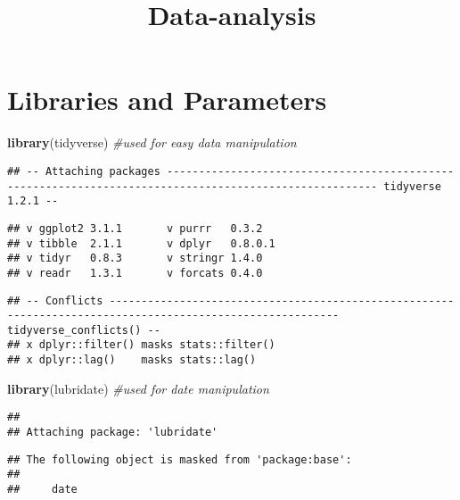 \documentclass[]{article}
\title{Data-analysis}
\author{}
\date{}
\newenvironment{Shaded}{\begin{snugshade}}{\end{snugshade}}
\newcommand{\CommentTok}[1]{\textcolor[rgb]{0.56,0.35,0.01}{\textit{#1}}}
\newcommand{\KeywordTok}[1]{\textcolor[rgb]{0.13,0.29,0.53}{\textbf{#1}}}
\newcommand{\NormalTok}[1]{#1}
\begin{document}
\maketitle

\hypertarget{libraries-and-parameters}{%
\section{Libraries and Parameters}\label{libraries-and-parameters}}

\begin{Shaded}
\begin{Highlighting}[]
\KeywordTok{library}\NormalTok{(tidyverse) }\CommentTok{#used for easy data manipulation}
\end{Highlighting}
\end{Shaded}

\begin{verbatim}
## -- Attaching packages ------------------------------------------------------------------------------------------------------- tidyverse 1.2.1 --
\end{verbatim}

\begin{verbatim}
## v ggplot2 3.1.1       v purrr   0.3.2  
## v tibble  2.1.1       v dplyr   0.8.0.1
## v tidyr   0.8.3       v stringr 1.4.0  
## v readr   1.3.1       v forcats 0.4.0
\end{verbatim}

\begin{verbatim}
## -- Conflicts ---------------------------------------------------------------------------------------------------------- tidyverse_conflicts() --
## x dplyr::filter() masks stats::filter()
## x dplyr::lag()    masks stats::lag()
\end{verbatim}

\begin{Shaded}
\begin{Highlighting}[]
\KeywordTok{library}\NormalTok{(lubridate) }\CommentTok{#used for date manipulation}
\end{Highlighting}
\end{Shaded}

\begin{verbatim}
## 
## Attaching package: 'lubridate'
\end{verbatim}

\begin{verbatim}
## The following object is masked from 'package:base':
## 
##     date
\end{verbatim}
\end{document}
